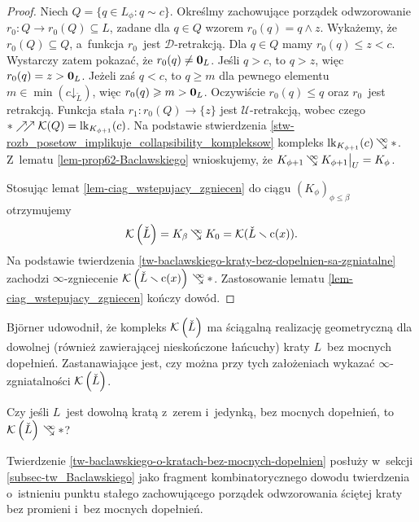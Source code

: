 \begin{proof}
Niech $Q=\{q\in L_\phi: q\sim c\}$. Określmy zachowujące porządek odwzorowanie $r_0\colon Q\to r_0(Q)\subseteq L$, zadane dla $q\in Q$ wzorem $r_0(q)=q\land z$. Wykażemy, że $r_0(Q)\subseteq Q$, a~funkcja $r_0$~jest $\mathcal{D}$-retrakcją. Dla $q\in Q$ mamy $r_0(q)\leq z< c$. Wystarczy zatem pokazać, że $r_0(q)\not=\mathbf{0}_L$. Jeśli $q>c$, to $q>z$, więc $r_0(q)=z>\mathbf{0}_L$. Jeżeli zaś $q<c$, to $q\geq m$ dla pewnego elementu $m\in \min\left(c\mathord{\downarrow}_{\check{L}}\right)$, więc $r_0(q)\geqslant m>\mathbf{0}_L$. Oczywiście $r_0(q)\leq q$ oraz $r_0$~jest retrakcją. Funkcja stała $r_1\colon r_0(Q)\to \{z\}$ jest \mbox{$\mathcal{U}$-retrakcją}, wobec czego $*\nearrow\!\!\nearrow \mathcal{K}(Q)=\operatorname{lk}_{K_{\phi+1}}(c)$. Na podstawie stwierdzenia \ref{stw-rozb_posetow_implikuje_collapsibility_kompleksow} kompleks $\lk_{K_{\phi+1}}(c)\infcoll *$. Z~lematu \ref{lem-prop62-Baclawskiego} wnioskujemy, że \mbox{$K_{\phi+1}\infcoll K_{\phi+1}\big|_U= K_{\phi}$}.

Stosując lemat \ref{lem-ciag_wstepujacy_zgniecen} do ciągu $\left(K_\phi\right)_{\phi\leq\beta}$ otrzymujemy \[\mK\left(\check{L}\right)=K_\beta\infcoll K_0=\mK(\check{L}\smallsetminus\operatorname{c}(x)).\] Na podstawie twierdzenia \ref{tw-baclawskiego-kraty-bez-dopelnien-sa-zgniatalne} zachodzi $\infty$-zgniecenie $\mK\left(\check{L}\smallsetminus \operatorname{c}(x)\right)\infcoll *$. Zastosowanie lematu \ref{lem-ciag_wstepujacy_zgniecen} kończy dowód.
\end{proof}

Bj{\"o}rner \cite[Theorem 3.3]{Bjorner81} udowodnił, że kompleks $\mathcal{K}\left(\check{L}\right)$ ma ściągalną realizację geometryczną dla dowolnej (również zawierającej nieskończone łańcuchy) kraty $L$~bez mocnych dopełnień. Zastanawiające jest, czy można przy tych założeniach wykazać $\infty$-zgniatalności $\mathcal{K}\left(\check{L}\right)$.
 
\begin{problem}\label{prob6}
Czy jeśli $L$~jest dowolną kratą z~zerem i~jedynką, bez mocnych dopełnień, to $\mK\left(\check{L}\right)\infcoll *$?
\end{problem}

Twierdzenie \ref{tw-baclawskiego-o-kratach-bez-mocnych-dopelnien} posłuży w~sekcji \ref{subsec-tw_Baclawskiego} jako fragment kombinatorycznego dowodu twierdzenia o~istnieniu punktu stałego zachowującego porządek odwzorowania ściętej kraty bez promieni i~bez mocnych dopełnień. 

